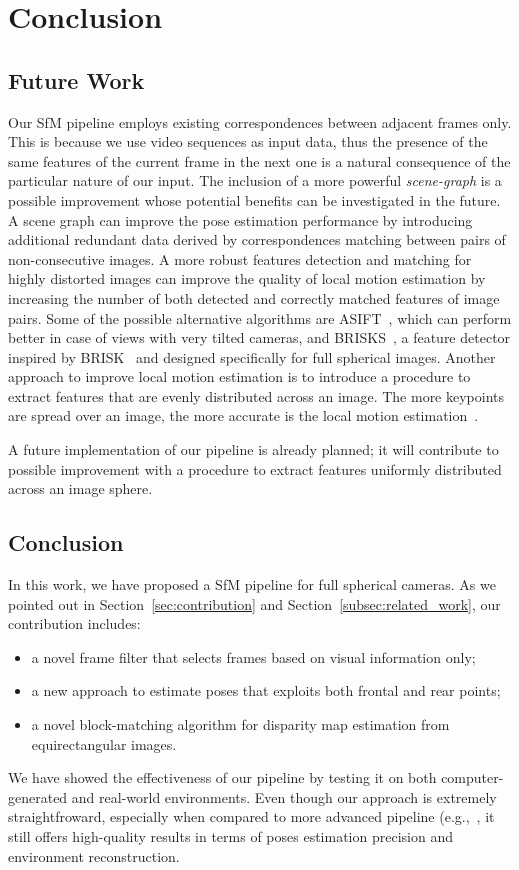\chapter{Conclusion}
%
\section{Future Work}
Our SfM pipeline employs existing correspondences between adjacent frames only.
This is because we use video sequences as input data, thus the presence of
the same features of the current frame in the next one is a natural consequence
of the particular nature of our input.
The inclusion of a more powerful \emph{scene-graph} is a possible improvement
whose potential benefits can be investigated in the future.
A scene graph can improve the pose estimation
performance by introducing additional redundant data derived by 
correspondences matching between pairs of non-consecutive images.
A more robust features detection and matching for highly distorted images
can improve the quality of local motion estimation by increasing the number
of both detected and correctly matched features of image pairs.
Some of the possible alternative algorithms are ASIFT~\cite{morel2009asift}, which
 can perform better in case of views with very tilted cameras, and
BRISKS~\cite{guan2017brisks}, a feature detector inspired by
BRISK~\cite{leutenegger2011brisk} and designed specifically for full spherical
images.
Another approach to improve local motion estimation is to
introduce a procedure to extract
features that are evenly distributed across an image. The more
keypoints are spread over an image, the more accurate is the local motion
estimation~\cite{irschara2009structure,schonberger2016structure}.

A future implementation of our pipeline is already planned; it will contribute
to possible improvement with a procedure to extract features uniformly
distributed across an image sphere. 

\section{Conclusion}
In this work, we have proposed a SfM pipeline for full spherical cameras.
As we pointed out in Section~\ref{sec:contribution} and
Section~\ref{subsec:related_work}, our contribution includes:
%
\begin{itemize}
	\item a novel frame filter that selects frames based on visual
	information only;
	\item a new approach to estimate poses that exploits both frontal and rear
	points;
	\item a novel block-matching algorithm for disparity map estimation from
	equirectangular images.
\end{itemize}
%
We have showed the effectiveness of our pipeline by testing it on 
both computer-generated and real-world environments.
Even though our approach is extremely straightfroward, especially when compared to more advanced pipeline (e.g.,~\cite{schonberger2016structure}, it still offers high-quality results in terms of
poses estimation precision and environment reconstruction.
